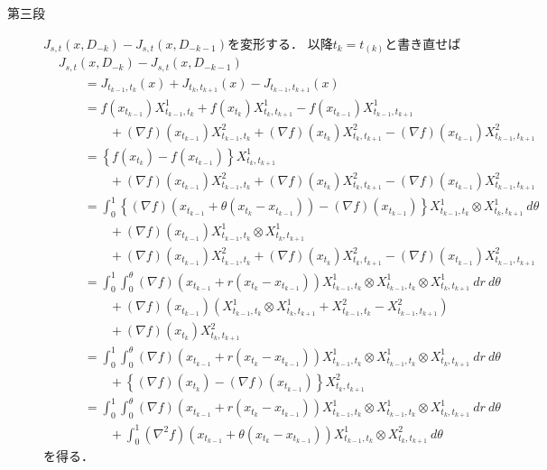 \begin{prf}
\begin{description}
			\item[第三段]
				$J_{s,t}(x,D_{-k}) - J_{s,t}(x,D_{-k-1})$を変形する．
				以降$t_k = t_{(k)}$と書き直せば
				\begin{align}
					&J_{s,t}(x,D_{-k}) - J_{s,t}(x,D_{-k-1}) \\
					&\qquad = J_{t_{k-1},t_k}(x) + J_{t_k,t_{k+1}}(x) - J_{t_{k-1},t_{k+1}}(x) \\
					&\qquad = f(x_{t_{k-1}}) X^1_{t_{k-1},t_k} + f(x_{t_k}) X^1_{t_k,t_{k+1}} - f(x_{t_{k-1}}) X^1_{t_{k-1},t_{k+1}} \\
						&\qquad \qquad + (\nabla f)(x_{t_{k-1}})X^2_{t_{k-1},t_k} + (\nabla f)(x_{t_k})X^2_{t_k,t_{k+1}} - (\nabla f)(x_{t_{k-1}})X^2_{t_{k-1},t_{k+1}} \\
					&\qquad = \left\{ f(x_{t_k}) - f(x_{t_{k-1}}) \right\} X^1_{t_k,t_{k+1}} \\
						&\qquad \qquad + (\nabla f)(x_{t_{k-1}})X^2_{t_{k-1},t_k} + (\nabla f)(x_{t_k})X^2_{t_k,t_{k+1}} - (\nabla f)(x_{t_{k-1}})X^2_{t_{k-1},t_{k+1}} \\
					&\qquad = \int_0^1 \left\{ (\nabla f)(x_{t_{k-1}} + \theta(x_{t_k} - x_{t_{k-1}})) - (\nabla f)(x_{t_{k-1}}) \right\} X^1_{t_{k-1},t_k} \otimes X^1_{t_k,t_{k+1}}\ d\theta \\
						&\qquad \qquad + (\nabla f)(x_{t_{k-1}})X^1_{t_{k-1},t_k} \otimes X^1_{t_k,t_{k+1}} \\
						&\qquad \qquad + (\nabla f)(x_{t_{k-1}})X^2_{t_{k-1},t_k} + (\nabla f)(x_{t_k})X^2_{t_k,t_{k+1}} - (\nabla f)(x_{t_{k-1}})X^2_{t_{k-1},t_{k+1}} \\
					&\qquad = \int_0^1 \int_0^\theta (\nabla f)(x_{t_{k-1}} + r(x_{t_k} - x_{t_{k-1}}))  X^1_{t_{k-1},t_k} \otimes X^1_{t_{k-1},t_k} \otimes X^1_{t_k,t_{k+1}}\ dr\ d\theta \\
						&\qquad \qquad + (\nabla f)(x_{t_{k-1}})\left( X^1_{t_{k-1},t_k} \otimes X^1_{t_k,t_{k+1}} + X^2_{t_{k-1},t_k} - X^2_{t_{k-1},t_{k+1}} \right) \\
						&\qquad \qquad + (\nabla f)(x_{t_k})X^2_{t_k,t_{k+1}} \\
					&\qquad = \int_0^1 \int_0^\theta (\nabla f)(x_{t_{k-1}} + r(x_{t_k} - x_{t_{k-1}}))  X^1_{t_{k-1},t_k} \otimes X^1_{t_{k-1},t_k} \otimes X^1_{t_k,t_{k+1}}\ dr\ d\theta \\
						&\qquad \qquad + \left\{ (\nabla f)(x_{t_k}) - (\nabla f)(x_{t_{k-1}}) \right\}X^2_{t_k,t_{k+1}} \\
					&\qquad = \int_0^1 \int_0^\theta (\nabla f)(x_{t_{k-1}} + r(x_{t_k} - x_{t_{k-1}}))  X^1_{t_{k-1},t_k} \otimes X^1_{t_{k-1},t_k} \otimes X^1_{t_k,t_{k+1}}\ dr\ d\theta \\
						&\qquad \qquad + \int_0^1 (\nabla^2 f)(x_{t_{k-1}} + \theta(x_{t_k} - x_{t_{k-1}})) X^1_{t_{k-1},t_k} \otimes X^2_{t_k,t_{k+1}}\ d\theta
				\end{align}
				を得る．
				

\end{description}
\end{prf}
